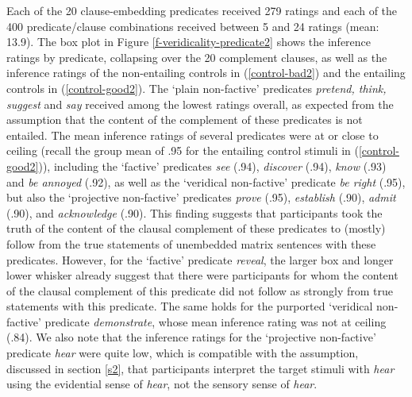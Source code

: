 \documentclass[11pt,fleqn]{article}
\newcommand{\6}{\mbox{$[\hspace*{-.6mm}[$}}
\newcommand{\9}{\mbox{$]\hspace*{-.6mm}]$}}
\begin{document}
Each of the 20 clause-embedding predicates received 279 ratings and each of the 400 predicate/clause combinations received between 5 and 24 ratings (mean: 13.9). The box plot in Figure \ref{f-veridicality-predicate2} shows the inference ratings by predicate, collapsing over the 20 complement clauses, as well as the inference ratings of the non-entailing controls in (\ref{control-bad2}) and the entailing controls in (\ref{control-good2}). The `plain non-factive' predicates {\em pretend, think, suggest} and {\em say} received among the lowest ratings overall, as expected from the assumption that the content of the complement of these predicates is not entailed.  The mean inference ratings of several predicates were at or close to ceiling (recall the group mean of .95 for the entailing control stimuli in (\ref{control-good2})), including the `factive' predicates {\em see} (.94), {\em discover} (.94),  {\em know} (.93) and {\em be annoyed} (.92), as well as the `veridical non-factive' predicate {\em be right} (.95), but also the `projective non-factive' predicates {\em prove} (.95),  {\em establish} (.90), {\em admit} (.90), and {\em acknowledge} (.90). This finding suggests that participants took the truth of the content of the clausal complement of these predicates to (mostly) follow from the true statements of unembedded matrix sentences with these predicates. However, for the `factive' predicate {\em reveal}, the larger box and longer lower whisker already suggest that there were participants for whom the content of the clausal complement of this predicate did not follow as strongly from true statements with this predicate. The same holds for the purported `veridical non-factive' predicate {\em demonstrate}, whose mean inference rating was not at ceiling (.84). We also note that the inference ratings for the `projective non-factive' predicate {\em hear} were quite low, which is compatible with the assumption, discussed in section \ref{s2}, that participants  interpret the target stimuli with {\em hear} using the evidential sense of {\em hear}, not the sensory sense of {\em hear}. 

\end{document}
